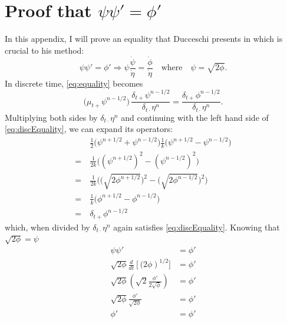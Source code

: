 \documentclass{article}
\begin{document}
\section{Proof that $\psi\psi' = \phi'$}\label{app:phiPsiProof}
In this appendix, I will prove an equality that Ducceschi presents in \cite{Ducceschi2019} which is crucial to his method:
\begin{equation}\label{eq:equality}
    \psi\psi' = \phi' \Rightarrow \psi\frac{\dot{\psi}}{\dot{\eta}} = \frac{\dot{\phi}}{\dot\eta}\quad \text{where}\quad \psi = \sqrt{2\phi}.
\end{equation}
In discrete time, \eqref{eq:equality} becomes
\begin{equation}\label{eq:discEquality}
    \big(\mu_{t+}\psi^{n-1/2}\big)\,\frac{\delta_{t+}\psi^{n-1/2}}{\delta_{t\cdot}\eta^n} = \frac{\delta_{t+}\phi^{n-1/2}}{\delta_{t\cdot}\eta^n}. 
\end{equation}
Multiplying both sides by $\delta_{t\cdot} \eta^n$ and continuing with the left hand side of \eqref{eq:discEquality}, we can expand its operators:
\begin{equation}
    \begin{aligned}\nonumber
        &\frac{1}{2}\big(\psi^{n+1/2}+\psi^{n-1/2}\big)\frac{1}{k}\big(\psi^{n+1/2}-\psi^{n-1/2}\big) \\
        =\ &\frac{1}{2k}\Big((\psi^{n+1/2})^2 - (\psi^{n-1/2})^2\Big)\\
        =\ &\frac{1}{2k}\bigg(\Big(\sqrt{2\phi^{n+1/2}}\Big)^2 - \Big(\sqrt{2\phi^{n-1/2}}\Big)^2\bigg)\\
        =\ &\frac{1}{k}\Big(\phi^{n+1/2} - \phi^{n-1/2}\Big)\\
        =\ &\delta_{t+}\phi^{n-1/2}
    \end{aligned}
\end{equation}
which, when divided by $\delta_{t\cdot}\eta^n$ again satisfies \eqref{eq:discEquality}.
Knowing that $\sqrt{2\phi}=\psi$
\begin{equation}
    \begin{aligned}
        \psi\psi' &= \phi'\\
        \sqrt{2\phi}\frac{d}{dt}\left[(2\phi\right)^{1/2}] &= \phi'\\
        \sqrt{2\phi}\left(\sqrt{2}\frac{\phi'}{2\sqrt{\phi}}\right) &= \phi'\\
        \sqrt{2\phi}\frac{\phi'}{\sqrt{2\phi}} &= \phi'\\
        \phi' &= \phi'
    \end{aligned}
\end{equation}
\end{document}
